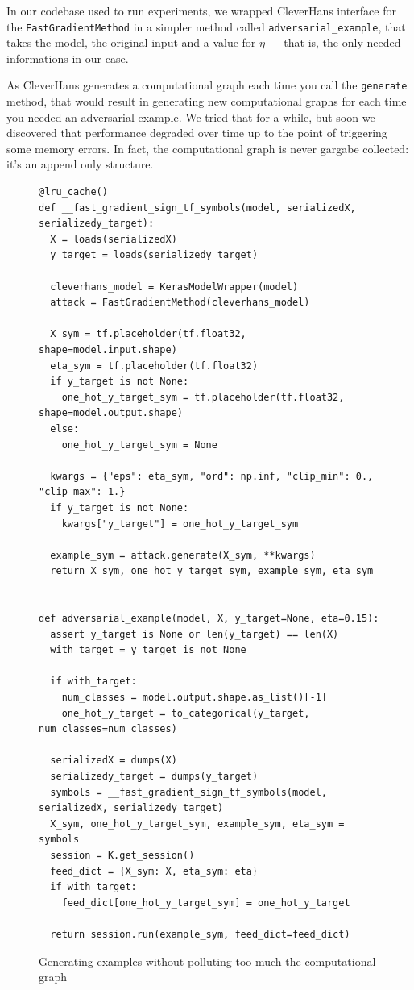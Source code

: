 In our codebase used to run experiments, we wrapped CleverHans
interface for the \texttt{FastGradientMethod} in a simpler method
called \texttt{adversarial\_example}, that takes the model, the
original input and a value for $\eta$ --- that is, the only needed
informations in our case.

As CleverHans generates a computational graph each time you call the
\texttt{generate} method, that would result in generating new
computational graphs for each time you needed an adversarial example.
We tried that for a while, but soon we discovered that performance
degraded over time up to the point of triggering some memory errors. In
fact, the computational graph is never gargabe collected: it's an
append only structure.

\begin{figure}
  \begin{verbatim}
@lru_cache()
def __fast_gradient_sign_tf_symbols(model, serializedX, serializedy_target):
  X = loads(serializedX)
  y_target = loads(serializedy_target)

  cleverhans_model = KerasModelWrapper(model)
  attack = FastGradientMethod(cleverhans_model)

  X_sym = tf.placeholder(tf.float32, shape=model.input.shape)
  eta_sym = tf.placeholder(tf.float32)
  if y_target is not None:
    one_hot_y_target_sym = tf.placeholder(tf.float32, shape=model.output.shape)
  else:
    one_hot_y_target_sym = None

  kwargs = {"eps": eta_sym, "ord": np.inf, "clip_min": 0., "clip_max": 1.}
  if y_target is not None:
    kwargs["y_target"] = one_hot_y_target_sym

  example_sym = attack.generate(X_sym, **kwargs)
  return X_sym, one_hot_y_target_sym, example_sym, eta_sym


def adversarial_example(model, X, y_target=None, eta=0.15):
  assert y_target is None or len(y_target) == len(X)
  with_target = y_target is not None

  if with_target:
    num_classes = model.output.shape.as_list()[-1]
    one_hot_y_target = to_categorical(y_target, num_classes=num_classes)

  serializedX = dumps(X)
  serializedy_target = dumps(y_target)
  symbols = __fast_gradient_sign_tf_symbols(model, serializedX, serializedy_target)
  X_sym, one_hot_y_target_sym, example_sym, eta_sym = symbols
  session = K.get_session()
  feed_dict = {X_sym: X, eta_sym: eta}
  if with_target:
    feed_dict[one_hot_y_target_sym] = one_hot_y_target

  return session.run(example_sym, feed_dict=feed_dict)
  \end{verbatim}
  \caption{Generating examples without polluting too much the computational graph}
  \label{fig:lru-cache}
\end{figure}

